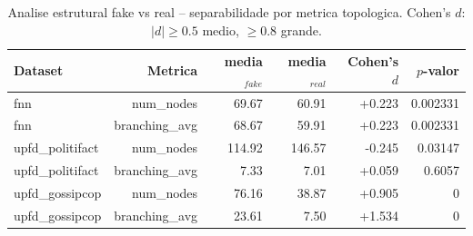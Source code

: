 \begin{table}[H]\centering
\caption{Analise estrutural fake vs real -- separabilidade por metrica topologica. Cohen's $d$: $|d|\geq 0.5$ medio, $\geq 0.8$ grande.}
\label{tab:cohens_d}
\begin{tabular}{lrrrrr}
\toprule
Dataset & Metrica & media$_{fake}$ & media$_{real}$ & Cohen's $d$ & $p$-valor \\
\midrule
fnn & num\_nodes & 69.67 & 60.91 & +0.223 & 0.002331 \\
fnn & branching\_avg & 68.67 & 59.91 & +0.223 & 0.002331 \\
upfd\_politifact & num\_nodes & 114.92 & 146.57 & -0.245 & 0.03147 \\
upfd\_politifact & branching\_avg & 7.33 & 7.01 & +0.059 & 0.6057 \\
upfd\_gossipcop & num\_nodes & 76.16 & 38.87 & +0.905 & 0 \\
upfd\_gossipcop & branching\_avg & 23.61 & 7.50 & +1.534 & 0 \\
\bottomrule
\end{tabular}
\end{table}
